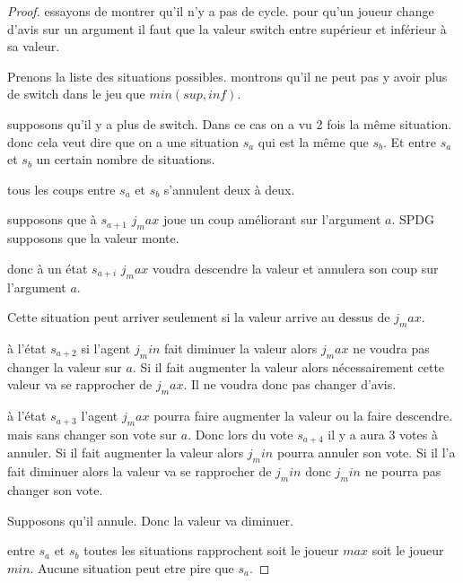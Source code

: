 \documentclass[12pt]{article}
\theoremstyle{defi}
\theoremstyle{not}
\theoremstyle{prob}
\begin{document}
      \begin{proof}
        essayons de montrer qu'il n'y a pas de cycle. pour qu'un joueur change d'avis sur un argument il faut que la valeur switch entre supérieur et inférieur à sa valeur.

        Prenons la liste des situations possibles.
        montrons qu'il ne peut pas y avoir plus de switch dans le jeu que $min(sup, inf)$.

        supposons qu'il y a plus de switch. Dans ce cas on a vu 2 fois la même situation. donc cela veut dire que on a une situation $s_a$ qui est la même que $s_b$. Et entre $s_a$ et $s_b$ un certain nombre de situations.

        tous les coups entre $s_a$ et $s_b$ s'annulent deux à deux.

        supposons que à $s_{a+1}$ $j_max$ joue un coup améliorant sur l'argument $a$. SPDG supposons que la valeur monte.

        donc à un état $s_{a+i}$ $j_max$ voudra descendre la valeur et annulera son coup sur l'argument $a$.

        Cette situation peut arriver seulement si la valeur arrive au dessus de $j_max$.

        à l'état $s_{a+2}$ si l'agent $j_min$ fait diminuer la valeur alors $j_max$ ne voudra pas changer la valeur sur $a$. Si il fait augmenter la valeur alors nécessairement cette valeur va se rapprocher de $j_max$. Il ne voudra donc pas changer d'avis.

        à l'état $s_{a+3}$ l'agent $j_max$ pourra faire augmenter la valeur ou la faire descendre. mais sans changer son vote sur $a$. Donc lors du vote $s_{a+4}$ il y a aura 3 votes à annuler.
        Si il fait augmenter la valeur alors $j_min$ pourra annuler son vote. Si il l'a fait diminuer alors la valeur va se rapprocher de $j_min$ donc $j_min$ ne pourra pas changer son vote.

        Supposons qu'il annule. Donc la valeur va diminuer.

        entre $s_a$ et $s_b$ toutes les situations rapprochent soit le joueur $max$ soit le joueur $min$. Aucune situation peut etre pire que $s_a$.
      \end{proof}
\end{document}
